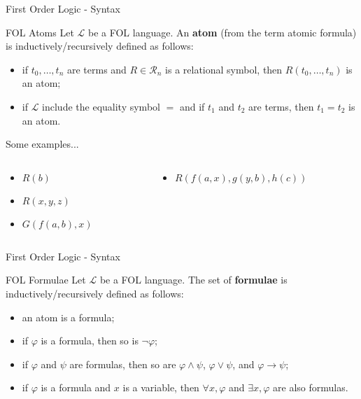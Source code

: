 \documentclass[aspectratio=169]{beamer}
\begin{document}
\begin{slide}{First Order Logic - Syntax}
  \begin{block}{FOL Atoms}  
  Let $\mathcal{L}$ be a FOL language. An {\bf atom} (from the term atomic formula) is inductively/recursively defined as follows:
  \begin{itemize}
  \item if $t_0,\ldots,t_n$ are terms and $R \in \mathcal{R}_n$ is a relational symbol, then $R(t_0,\ldots,t_n)$ is an atom;
  \item if $\mathcal{L}$ include the equality symbol $=$ and if $t_1$ and $t_2$ are terms, then $t_1 = t_2$ is an atom.  
  \end{itemize}
  \end{block}
  
  \begin{block}{Some examples...}
  \begin{columns}
    \begin{column}{0.48\textwidth}
      \begin{itemize}
        \item $R(b)$
        \item $R(x,y,z)$
        \item $G(f(a,b),x)$
      \end{itemize}
    \end{column}
    \begin{column}{0.48\textwidth}
      \begin{itemize}
        \item $R(f(a,x),g(y,b),h(c))$
      \end{itemize}        
    \end{column}
  \end{columns}
  \end{block}

\end{slide}

\begin{slide}{First Order Logic - Syntax}
  \begin{block}{FOL Formulae}  
  Let $\mathcal{L}$ be a FOL language. The set of {\bf formulae} is inductively/recursively defined  as follows:
  \begin{itemize}
  \item an atom is a formula;
  \item if $\varphi$ is a formula, then so is $\neg\varphi$;
  \item if $\varphi$ and $\psi$ are formulas, then so are $\varphi \land \psi$, $\varphi \lor \psi$, and $\varphi \to \psi$;
  \item if $\varphi$ is a formula and $x$ is a variable, then $\forall x, \varphi$ and $\exists x, \varphi$ are also formulas.
  \end{itemize}
  \end{block}
\end{slide}
\end{document}
